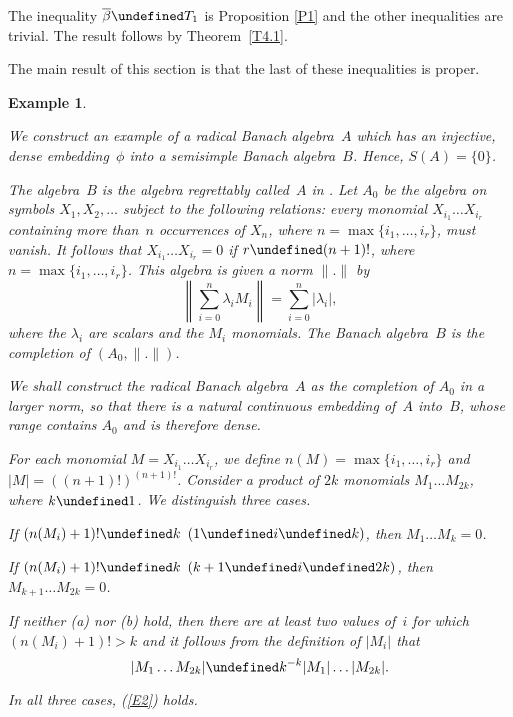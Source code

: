 \documentclass[11pt]{article}
\newcounter{alenum}
\newenvironment{alenumerate}{\begin{list}{(\alph{alenum})}%
{\usecounter{alenum}}}{\end{list}}
\let\leq\undefined  \let\geq\undefined
\let\le\leq   \let\ge\geq
\newenvironment{Proof}{{\it Proof. }}{}%
\newtheorem{example}[thm]{Example}
\newenvironment{Example}{\begin{example}\begin{rm}}{\end{rm}\end{example}}
\newcommand{\nn}[1]{|#1|}
\begin{document}
\begin{Proof}
The inequality $\overline\beta \le T_1$ is Proposition \ref{P1} and the other
inequalities are trivial.   The result follows by Theorem~\ref{T4.1}.
\end{Proof}

\vspace{2ex}
The main result of this section is that the last of these inequalities is
proper.

\begin{Example}\label{MainEx}
We construct an example of a radical Banach algebra~$A$ which has an
injective, dense embedding~$\phi$ into a semisimple Banach algebra~$B$.  Hence,
$S(A) = \{0\}$.

The algebra~$B$ is the algebra regrettably called~$A$ in \cite{PGD12}.   Let $A_0$
be the algebra on symbols $X_1, X_2, \dots$ subject to the following relations:
every monomial $X_{i_1}\dots X_{i_r}$ containing more than~$n$ occurrences of
$X_n$, where $n = \max\{i_1,\dots,i_r\}$, must vanish.   It follows that
$X_{i_1}\dots X_{i_r} = 0$ if $r \ge (n+1)!$, where $n = \max\{i_1,\dots,i_r\}$.
This algebra is given a norm $\|.\|$ by
$$\left\|\sum_{i=0}^n \lambda_iM_i\right\| = \sum_{i=0}^n |\lambda_i|,$$
where the $\lambda_i$ are scalars and the $M_i$ monomials.   The Banach
algebra~$B$ is the completion of $(A_0,\|.\|)$.

We shall construct the radical Banach algebra~$A$ as the completion of
$A_0$ in a larger norm, so that there is a natural continuous embedding
of~$A$ into~$B$, whose range contains $A_0$ and is therefore dense.

For each monomial $M = X_{i_1}\dots X_{i_r}$, we define
$n(M) = \max\{i_1,\dots,i_r\}$ and \linebreak $\nn{M} = ((n+1)!)^{(n+1)!}$.
Consider a product of $2k$ monomials $M_1\dots M_{2k}$, where $k \ge 1$.
We distinguish three cases.
\begin{alenumerate}
\item If $(n(M_i)+1)! \le k$ $(1\le i\le k)$, then $M_1\dots M_k = 0$.
\item If $(n(M_i)+1)! \le k$ $(k+1\le i\le 2k)$, then
$M_{k+1}\dots M_{2k} = 0$.
\item If neither (a) nor (b) hold, then there are at least two values of~$i$ for
which \linebreak
$(n(M_i)+1)! > k$ and it follows from the definition of $\nn{M_i}$ that
\begin{equation}\label{E2}
\nn{M_1\dots M_{2k}} \le k^{-k} \nn{M_1}\dots\nn{M_{2k}}.
\end{equation}
\end{alenumerate}
In all three cases, (\ref{E2}) holds.


\end{Example}
\end{document}
